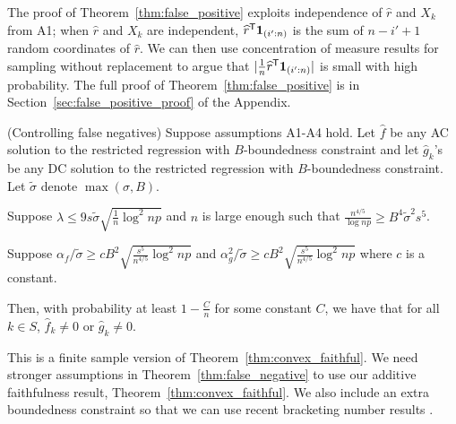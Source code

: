 The proof of Theorem~\ref{thm:false_positive} exploits independence of
$\hat{r}$ and $X_k$ from A1; when $\hat{r}$ and $X_k$ are independent,
$\widehat{r}^{\mathsf{T}} \mbox{\boldmath $1$}_{(i':n)}$ is the sum of $n - i' +1$ random
coordinates of $\hat{r}$.  We can then use concentration of
measure results for sampling without replacement to argue that $|
\frac{1}{n} \widehat{r}^{\mathsf{T}}\mbox{\boldmath $1$}_{(i':n)}|$ is small with high
probability. The full proof of Theorem~\ref{thm:false_positive} is in
Section~\ref{sec:false_positive_proof} of the Appendix.

\begin{theorem} (Controlling false negatives) 
\label{thm:false_negative}
Suppose assumptions A1-A4 hold. Let $\hat{f}$ be any AC solution to the restricted regression with $B$-boundedness constraint and let $\hat{g}_k$'s be any DC solution to the restricted regression with $B$-boundedness constraint. Let $\tilde{\sigma}$ denote $\max(\sigma, B)$.

Suppose $\lambda \leq 9 s \tilde{\sigma} \sqrt{\frac{1}{n} \log^2 np}$ and $n$ is large enough such that $\frac{n^{4/5}}{\log np} \geq B^4 \tilde{\sigma}^2 s^5$. 

Suppose 
$\alpha_f/\tilde{\sigma} \geq c B^2 \sqrt{\frac{s^5}{n^{4/5}} \log^2 np}$ and $\alpha_g^2/\tilde{\sigma} \geq c B^2 \sqrt{\frac{s^5}{n^{4/5}} \log^2 np}$ where $c$ is a constant.

Then, with probability at least $1 - \frac{C}{n}$ for some constant $C$, we have that for all $k \in S$, $\hat{f}_k \neq 0$ or $\hat{g}_k \neq 0$. 

\end{theorem}

This is a finite sample version of
Theorem~\ref{thm:convex_faithful}. We need stronger assumptions in
Theorem~\ref{thm:false_negative} to use our additive faithfulness
result, Theorem~\ref{thm:convex_faithful}. We also include an extra
boundedness constraint so that we can use recent bracketing number
results \cite{kim2014global}.


